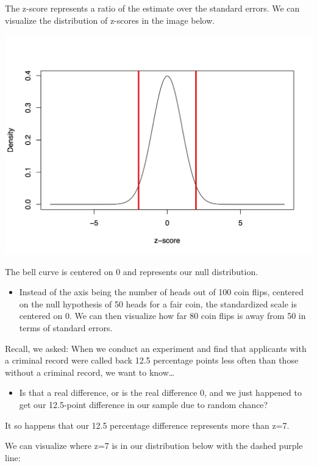 \documentclass[
  letterpaper,
  DIV=11,
  numbers=noendperiod]{scrreprt}
\providecommand{\tightlist}{%
  \setlength{\itemsep}{0pt}\setlength{\parskip}{0pt}}\usepackage{longtable,booktabs,array}
\begin{document}
The z-score represents a ratio of the estimate over the standard errors.
We can visualize the distribution of z-scores in the image below.

\includegraphics{images/zscore.png}

The bell curve is centered on 0 and represents our null distribution.

\begin{itemize}
\tightlist
\item
  Instead of the axis being the number of heads out of 100 coin flips,
  centered on the null hypothesis of 50 heads for a fair coin, the
  standardized scale is centered on 0. We can then visualize how far 80
  coin flips is away from 50 in terms of standard errors.
\end{itemize}

Recall, we asked: When we conduct an experiment and find that applicants
with a criminal record were called back 12.5 percentage points less
often than those without a criminal record, we want to know\ldots{}

\begin{itemize}
\tightlist
\item
  Is that a real difference, or is the real difference 0, and we just
  happened to get our 12.5-point difference in our sample due to random
  chance?
\end{itemize}

It so happens that our 12.5 percentage difference represents more than
z=7.

We can visualize where z=7 is in our distribution below with the dashed
purple line:
\end{document}
